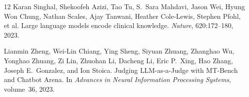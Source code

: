 \documentclass[10pt, twocolumn, a4paper]{article}
\begin{document}
\begin{thebibliography}{12}
Karan Singhal, Shekoofeh Azizi, Tao Tu, S.~Sara Mahdavi, Jason Wei, Hyung Won Chung, Nathan Scales, Ajay Tanwani, Heather Cole-Lewis, Stephen Pfohl, et al.
\newblock Large language models encode clinical knowledge.
\newblock \emph{Nature}, 620:172--180, 2023.

Lianmin Zheng, Wei-Lin Chiang, Ying Sheng, Siyuan Zhuang, Zhanghao Wu, Yonghao Zhuang, Zi Lin, Zhuohan Li, Dacheng Li, Eric P.~Xing, Hao Zhang, Joseph E.~Gonzalez, and Ion Stoica.
\newblock Judging LLM-as-a-Judge with MT-Bench and Chatbot Arena.
\newblock In \emph{Advances in Neural Information Processing Systems}, volume~36, 2023.

\end{thebibliography}
\end{document}
